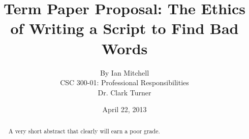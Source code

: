 \documentclass[12pt]{article}
\begin{document}
%
%
\title{\vfill
	Term Paper Proposal: The Ethics of Writing a Script to Find Bad Words
}
\author{
	By Ian Mitchell \vspace{10pt} \\
	CSC 300-01: Professional Responsibilities  \vspace{10pt} \\
	Dr. Clark Turner \vspace{10pt} \\
}
\date{April 22, 2013}

\maketitle

\vfill
\begin{abstract}
A very short abstract that clearly will earn a poor grade.
\end{abstract}

\thispagestyle{empty}
\newpage


%
%
\thispagestyle{empty}
\tableofcontents
\newpage
\end{document}
